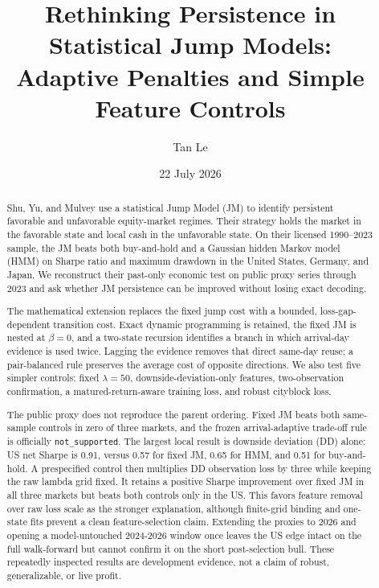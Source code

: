 \documentclass[11pt]{article}
\title{Rethinking Persistence in Statistical Jump Models:\\
Adaptive Penalties and Simple Feature Controls}
\author{Tan Le}
\date{22 July 2026}
\begin{document}
\maketitle

\begin{abstract}
Shu, Yu, and Mulvey use a statistical Jump Model (JM) to identify persistent
favorable and unfavorable equity-market regimes. Their strategy holds the
market in the favorable state and local cash in the unfavorable state. On
their licensed 1990--2023 sample, the JM beats both buy-and-hold and a Gaussian
hidden Markov model (HMM) on Sharpe ratio and maximum drawdown in the United
States, Germany, and Japan. We reconstruct their past-only economic test on
public proxy series through 2023 and ask whether JM persistence can be improved
without losing exact decoding.

The mathematical extension replaces the fixed jump cost with a bounded,
loss-gap-dependent transition cost. Exact dynamic programming is retained,
the fixed JM is nested at \(\beta=0\), and a two-state recursion identifies a
branch in which arrival-day evidence is used twice. Lagging the evidence removes
that direct same-day reuse; a pair-balanced rule preserves the average cost of
opposite directions. We also test five simpler controls: fixed
\(\lambda=50\), downside-deviation-only features, two-observation confirmation,
a matured-return-aware training loss, and robust cityblock loss.

The public proxy does not reproduce the parent ordering. Fixed JM beats both
same-sample controls in zero of three markets, and the frozen arrival-adaptive
trade-off rule is officially \texttt{not\_supported}. The largest local result
is downside deviation (DD) alone: US net Sharpe is 0.91, versus 0.57 for
fixed JM, 0.65 for HMM, and 0.51 for buy-and-hold. A prespecified control
then multiplies DD observation loss by three while keeping the raw lambda grid
fixed. It retains a positive Sharpe improvement over fixed JM in all three
markets but beats both controls only in the US. This favors feature removal
over raw loss scale as the stronger explanation, although finite-grid binding
and one-state fits prevent a clean feature-selection claim. Extending the
proxies to 2026 and opening a model-untouched 2024-2026 window once leaves the
US edge intact on the full walk-forward but cannot confirm it on the short
post-selection bull. These repeatedly inspected results are development
evidence, not a claim of robust, generalizable, or live profit.
\end{abstract}
\end{document}
